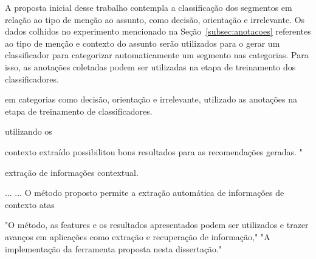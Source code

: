 
A proposta inicial desse trabalho contempla a classificação dos segmentos em relação ao tipo de menção ao assunto, como decisão, orientação e irrelevante. Os dados colhidos no experimento mencionado na Seção~\ref{subsec:anotacoes} referentes ao tipo de menção e contexto do assunto serão utilizados para o gerar um classificador para categorizar automaticamente um segmento nas categorias. Para isso, as anotações coletadas podem ser utilizadas na etapa de treinamento dos classificadores.


em categorias como decisão, orientação e irrelevante, utilizado as anotações na etapa de treinamento de classificadores.





utilizando os 



















contexto extraído possibilitou bons resultados para as recomendações geradas. "



extração de informações contextual. 


















...
...
O método proposto permite a extração automática de informações de contexto atas



	"O método, as features e os resultados apresentados podem ser utilizados e trazer avanços em aplicações como extração e recuperação de informação,"
	"A implementação da ferramenta proposta nesta dissertação."







